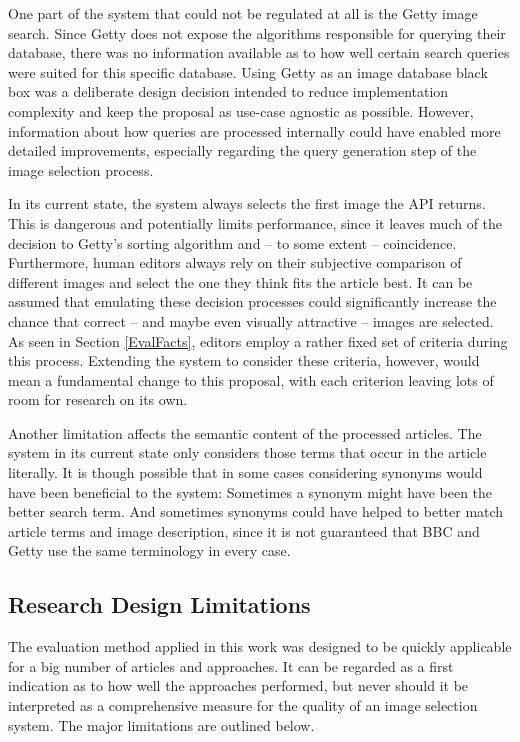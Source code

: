 \documentclass[11pt,a4paper,twoside]{article}
\begin{document}
One part of the system that could not be regulated at all is the Getty image search. Since Getty does not expose the algorithms responsible for querying their database, there was no information available as to how well certain search queries were suited for this specific database. Using Getty as an image database black box was a deliberate design decision intended to reduce implementation complexity and keep the proposal as use-case agnostic as possible. However, information about how queries are processed internally could have enabled more detailed improvements, especially regarding the query generation step of the image selection process.

In its current state, the system always selects the first image the API returns. This is dangerous and potentially limits performance, since it leaves much of the decision to Getty's sorting algorithm and -- to some extent -- coincidence. Furthermore, human editors always rely on their subjective comparison of different images and select the one they think fits the article best. It can be assumed that emulating these decision processes could significantly increase the chance that correct -- and maybe even visually attractive -- images are selected. As seen in Section \ref{EvalFacts}, editors employ a rather fixed set of criteria during this process. Extending the system to consider these criteria, however, would mean a fundamental change to this proposal, with each criterion leaving lots of room for research on its own.

Another limitation affects the semantic content of the processed articles. The system in its current state only considers those terms that occur in the article literally. It is though possible that in some cases considering synonyms would have been beneficial to the system: Sometimes a synonym might have been the better search term. And sometimes synonyms could have helped to better match article terms and image description, since it is not guaranteed that BBC and Getty use the same terminology in every case.

\subsection{Research Design Limitations} \label{LimitsEval}

The evaluation method applied in this work was designed to be quickly applicable for a big number of articles and approaches. It can be regarded as a first indication as to how well the approaches performed, but never should it be interpreted as a comprehensive measure for the quality of an image selection system. The major limitations are outlined below.
\end{document}
